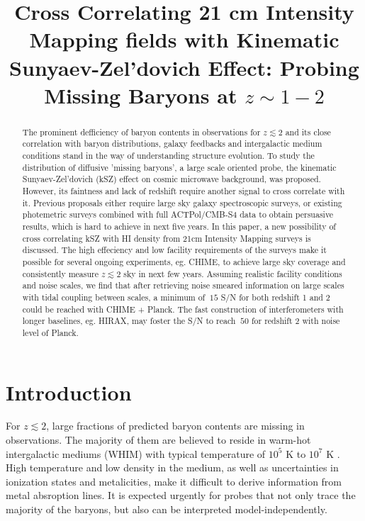 \documentclass[aps,prd,twocolumn,showpacs,superscriptaddress,groupedaddress,nofootinbib]{revtex4}  %
\begin{document}
\widetext

\title{Cross Correlating 21 cm Intensity Mapping fields with Kinematic Sunyaev-Zel'dovich Effect: Probing Missing Baryons at $z\sim1-2$}

\begin{abstract}
    The prominent defficiency of baryon contents in observations for $z\lesssim 2$ 
    and its close correlation with baryon distributions, galaxy feedbacks and 
    intergalactic medium conditions stand in the way of understanding structure 
    evolution. 
 To study the distribution of diffusive 'missing baryons', 
a large scale oriented probe, 
the kinematic Sunyaev-Zel'dovich (kSZ) effect 
on cosmic microwave background, was proposed.
However, its faintness and lack of redshift require another 
signal to cross correlate with it. 
Previous proposals either require large sky galaxy spectroscopic surveys, 
or existing photemetric surveys combined with full ACTPol/CMB-S4 data to 
obtain persuasive results,
which is hard to achieve in next five years. 
In this paper, a new possibility of cross correlating 
    kSZ with HI density from 21cm Intensity Mapping surveys is discussed. 
    The high effeciency and low facility requirements of the surveys  
make it possible for several ongoing experiments, eg. CHIME, to achieve large sky coverage 
    and consistently measure $z\lesssim2$ sky in next few years. 
Assuming realistic facility conditions and noise scales, 
we find that after retrieving noise smeared 
    information on large scales with tidal coupling between scales, 
    a minimum of $~15$ S/N for both redshift 1 and 2 could be reached with CHIME + Planck. 
The fast construction of interferometers with longer baselines, eg. HIRAX, 
  may foster the S/N to reach $~50$ for redshift 2 with noise level of Planck.
\end{abstract}
\pacs{}
\maketitle

\section{Introduction}
For $z\lesssim 2$, large fractions of predicted baryon contents are missing in observations.  
The majority of them are believed to reside in warm-hot intergalactic mediums (WHIM) with typical temperature of $10^5$ K to $10^7$ K \cite{Pen1999,Soltan06}. 
High temperature and low density in the medium, 
as well as uncertainties in ionization states and metalicities, 
make it difficult to derive information from metal absroption lines. 
It is expected urgently for probes that not only trace the majority of the baryons, but also can be interpreted model-independently.
\end{document}
